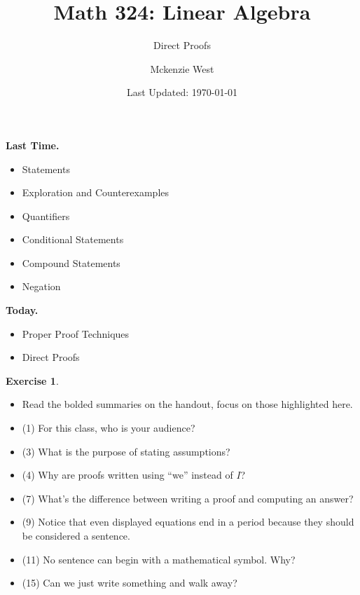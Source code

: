 \documentclass{beamer}
\newcommand{\fn}{\insertframenumber}
\theoremstyle{definition}
\newtheorem{exercise}{Exercise}
\begin{document}
	\title{Math 324: Linear Algebra}
	\subtitle{Direct Proofs}
	\author{Mckenzie West}
	\date{Last Updated: \today}
\begin{frame}
\maketitle
\end{frame}

\begin{frame}{\insertframenumber}
	\begin{block}{\textbf{Last Time.}}
	\begin{itemize}[label=--]
		\item Statements
		\item Exploration and Counterexamples
		\item Quantifiers
		\item Conditional Statements
		\item Compound Statements
		\item Negation
	\end{itemize}
	\end{block}
\begin{block}{\textbf{Today.}}
	\begin{itemize}[label=--]
		\item Proper Proof Techniques
		\item Direct Proofs
	\end{itemize}
\end{block}
\end{frame}

\begin{frame}{\fn}
	\begin{exercise}
		\begin{itemize}[label=--]
			\item Read the bolded summaries on the handout, focus on those highlighted here.
			\item (1) For this class, who is your audience?
			\item (3) What is the purpose of stating assumptions?
			\item (4) Why are proofs written using ``we'' instead of $I$?
			\item (7) What's the difference between writing a proof and computing an answer?
			\item (9) Notice that even displayed equations end in a period because they should be considered a sentence.
			\item (11) No sentence can begin with a mathematical symbol.  Why?
			\item (15) Can we just write something and walk away?
		\end{itemize}
	\end{exercise}
\end{frame}
\end{document}
